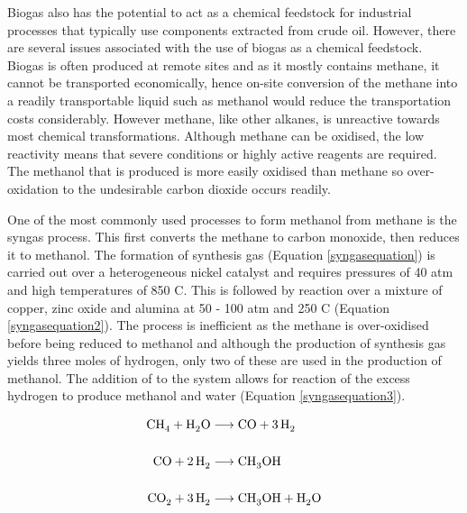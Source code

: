 Biogas also has the potential to act as a chemical feedstock for industrial processes that typically use components extracted from crude oil.\cite{Poliakoff2002}  However, there are several issues associated with the use of biogas as a chemical feedstock.  Biogas is often produced at remote sites and as it mostly contains methane, it cannot be transported economically,\cite{Crabtree2001} hence on-site conversion of the methane into a readily transportable liquid such as methanol would reduce the transportation costs considerably.  However methane, like other alkanes, is unreactive towards most chemical transformations.  Although methane can be oxidised, the low reactivity means that severe conditions or highly active reagents are required.  The methanol that is produced is more easily oxidised than methane so over-oxidation to the undesirable carbon dioxide occurs readily. \cite{Crabtree2001}  

One of the most commonly used processes to form methanol from methane is the syngas process.  This first converts the methane to carbon monoxide, then reduces it to methanol.  The formation of synthesis gas (Equation \ref{syngasequation}) is carried out over a heterogeneous nickel catalyst and requires pressures of 40 atm and high temperatures of 850 \degrees C.  This is followed by reaction over a mixture of copper, zinc oxide and alumina at 50 - 100 atm and 250 \degrees C (Equation \ref{syngasequation2}). The process is inefficient as the methane is over-oxidised before being reduced to methanol\cite{Crabtree2001} and although the production of synthesis gas yields three moles of hydrogen, only two of these are used in the production of methanol.  The addition of  to the system allows for reaction of the excess hydrogen to produce methanol and water (Equation \ref{syngasequation3}).

\vspace{-1cm}
\begin{align}
\ce{CH4 + H2O} & \longrightarrow \ce{CO + 3H2} \label{syngasequation} \\[0.5cm]
\ce{CO + 2H2} & \longrightarrow \ce{CH3OH} \label{syngasequation2} \\[0.5cm]
\ce{CO2 + 3H2} & \longrightarrow \ce{CH3OH + H2O} \label{syngasequation3}
\end{align}
\vspace{-2cm}

